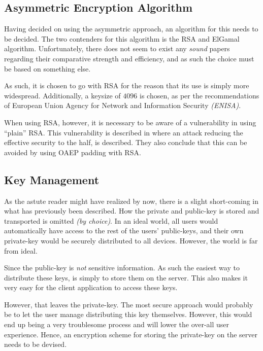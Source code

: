 		\subsection{Asymmetric Encryption Algorithm}
			\label{sec:encryption_choice:rsa_size}
			Having decided on using the asymmetric approach, an algorithm for this needs to be decided. The two contenders for this algorithm is the RSA and ElGamal algorithm. Unfortunately, there does not seem to exist any \emph{sound} papers regarding their comparative strength and efficiency, and as such the choice must be based on something else.

			As such, it is chosen to go with RSA for the reason that its use is simply more widespread. Additionally, a keysize of $4096$ is chosen, as per the recommendations of European Union Agency for Network and Information Security \emph{(ENISA)}\cite[p.37]{enisa}.

			When using RSA, however, it is necessary to be aware of a vulnerability in using ``plain'' RSA. This vulnerability is described in \cite{boneh2000textbook} where an attack reducing the effective security to the half, is described. They also conclude that this can be avoided by using OAEP padding with RSA.

		\subsection{Key Management}
			\label{sec:keys}
			As the astute reader might have realized by now, there is a slight short-coming in what has previously been described. How the private and public-key is stored and transported is omitted \emph{(by choice)}. In an ideal world, all users would automatically have access to the rest of the users' public-keys, and their own private-key would be securely distributed to all devices. However, the world is far from ideal.

			Since the public-key is \emph{not} sensitive information. As such the easiest way to distribute these keys, is simply to store them on the server. This also makes it very easy for the client application to access these keys.

			However, that leaves the private-key. The most secure approach would probably be to let the user manage distributing this key themselves. However, this would end up being a very troublesome process and will lower the over-all user experience. Hence, an encryption scheme for storing the private-key on the server needs to be devised.

